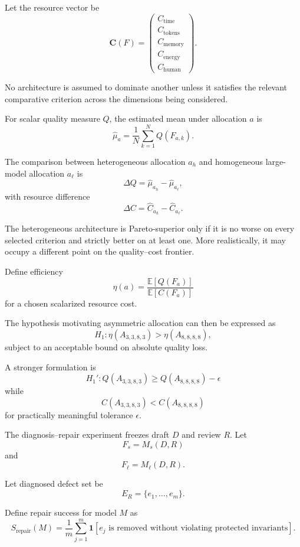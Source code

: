 \documentclass[11pt]{article}
\begin{document}
Let the resource vector be
\[
    \mathbf{C}(F)
    =
    \begin{pmatrix}
        C_{\mathrm{time}}\\
        C_{\mathrm{tokens}}\\
        C_{\mathrm{memory}}\\
        C_{\mathrm{energy}}\\
        C_{\mathrm{human}}
    \end{pmatrix}.
\]

No architecture is assumed to dominate another unless it satisfies the relevant comparative criterion across the dimensions being considered.

For scalar quality measure \(Q\), the estimated mean under allocation \(a\) is
\[
    \widehat{\mu}_a
    =
    \frac{1}{N}
    \sum_{k=1}^{N}
    Q(F_{a,k}).
\]

The comparison between heterogeneous allocation \(a_h\) and homogeneous large-model allocation \(a_\ell\) is
\[
    \Delta Q
    =
    \widehat{\mu}_{a_h}
    -
    \widehat{\mu}_{a_\ell},
\]
with resource difference
\[
    \Delta C
    =
    \widehat C_{a_h}
    -
    \widehat C_{a_\ell}.
\]

The heterogeneous architecture is Pareto-superior only if it is no worse on every selected criterion and strictly better on at least one. More realistically, it may occupy a different point on the quality--cost frontier.

Define efficiency
\[
    \eta(a)
    =
    \frac{
        \mathbb{E}[Q(F_a)]
    }{
        \mathbb{E}[C(F_a)]
    }
\]
for a chosen scalarized resource cost.

The hypothesis motivating asymmetric allocation can then be expressed as
\[
    H_1:
    \eta(A_{3,3,8,3})
    >
    \eta(A_{8,8,8,8}),
\]
subject to an acceptable bound on absolute quality loss.

A stronger formulation is
\[
    H_1':
    Q(A_{3,3,8,3})
    \geq
    Q(A_{8,8,8,8})-\epsilon
\]
while
\[
    C(A_{3,3,8,3})
    <
    C(A_{8,8,8,8})
\]
for practically meaningful tolerance \(\epsilon\).

The diagnosis--repair experiment freezes draft \(D\) and review \(R\). Let
\[
    F_s
    =
    M_s(D,R)
\]
and
\[
    F_\ell
    =
    M_\ell(D,R).
\]

Let diagnosed defect set be
\[
    E_R
    =
    \{e_1,\ldots,e_m\}.
\]

Define repair success for model \(M\) as
\[
    S_{\mathrm{repair}}(M)
    =
    \frac{1}{m}
    \sum_{j=1}^{m}
    \mathbf{1}
    \left[
        e_j
        \text{ is removed without violating protected invariants}
    \right].
\]
\end{document}
